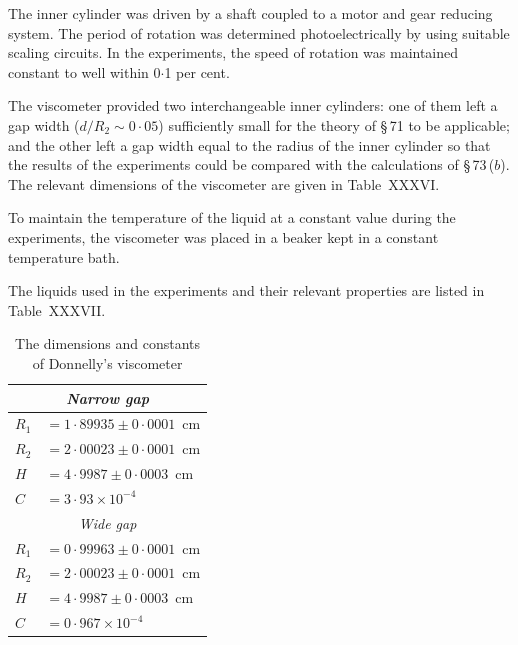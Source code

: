 The inner cylinder was driven by a shaft coupled to a motor and gear
reducing system.  The period of rotation was determined photo\-electrically
by using suitable scaling circuits.  In the experiments, the
speed of rotation was maintained constant to well within 0$\cdot$1 per cent.

The viscometer provided two interchangeable inner cylinders: one of
them left a gap width ($d/R_2 \sim 0{\cdot}05$) sufficiently small for the theory
of \S\,71 to be applicable; and the other left a gap width equal to the radius
of the inner cylinder so that the results of the experiments could be
compared with the calculations of \S\,73\,($b$).  The relevant dimensions
of the viscometer are given in Table~XXXVI.

To maintain the temperature of the liquid at a constant value during
the experiments, the viscometer was placed in a beaker kept in a constant
temperature bath.

The liquids used in the experiments and their relevant properties are
listed in Table~XXXVII.

\begin{table}[ht]
\centering
\caption{The dimensions and constants of Donnelly's viscometer}
\label{tab:XXXVI}
\medskip
\begin{tabular}{ll}
\hline
\multicolumn{2}{c}{\textit{Narrow gap}} \\
\hline
$R_1$ & $= 1{\cdot}89935 \pm 0{\cdot}0001$~cm \\
$R_2$ & $= 2{\cdot}00023 \pm 0{\cdot}0001$~cm \\
$H$   & $= 4{\cdot}9987 \pm 0{\cdot}0003$~cm \\
$C$   & $= 3{\cdot}93 \times 10^{-4}$ \\
\hline
\multicolumn{2}{c}{\textit{Wide gap}} \\
\hline
$R_1$ & $= 0{\cdot}99963 \pm 0{\cdot}0001$~cm \\
$R_2$ & $= 2{\cdot}00023 \pm 0{\cdot}0001$~cm \\
$H$   & $= 4{\cdot}9987 \pm 0{\cdot}0003$~cm \\
$C$   & $= 0{\cdot}967 \times 10^{-4}$ \\
\hline
\end{tabular}
\end{table}

